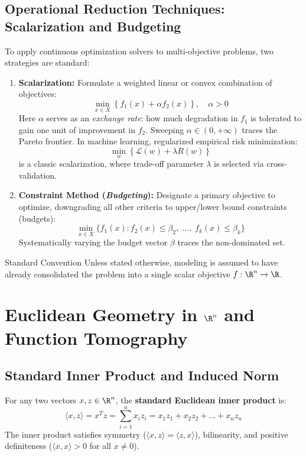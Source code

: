 \subsection{Operational Reduction Techniques: Scalarization and Budgeting}
To apply continuous optimization solvers to multi-objective problems, two strategies are standard:
\begin{enumerate}
    \item \textbf{Scalarization:} Formulate a weighted linear or convex combination of objectives:
    \begin{equation}
    \min_{x \in X} \left\{ f_1(x) + \alpha f_2(x) \right\}, \quad \alpha > 0
    \end{equation}
    Here $\alpha$ serves as an \textit{exchange rate}: how much degradation in $f_1$ is tolerated to gain one unit of improvement in $f_2$. Sweeping $\alpha \in (0, +\infty)$ traces the Pareto frontier. In machine learning, regularized empirical risk minimization:
    \begin{equation}
    \min_w \left\{ \mathcal{L}(w) + \lambda R(w) \right\}
    \end{equation}
    is a classic scalarization, where trade-off parameter $\lambda$ is selected via cross-validation.
    
    \item \textbf{Constraint Method (\textit{Budgeting}):} Designate a primary objective to optimize, downgrading all other criteria to upper/lower bound constraints (budgets):
    \begin{equation}
    \min_{x \in X} \{ f_1(x) : f_2(x) \le \beta_2, \; \dots, \; f_k(x) \le \beta_k \}
    \end{equation}
    Systematically varying the budget vector $\beta$ traces the non-dominated set.
\end{enumerate}

\begin{noteblock}{Standard Convention}
Unless stated otherwise, modeling is assumed to have already consolidated the problem into a single scalar objective $f: \R^n \to \R$.
\end{noteblock}


\FloatBarrier
\section{Euclidean Geometry in \texorpdfstring{$\R^n$}{R\textasciicircum n} and Function Tomography}
\label{sec:opt-euclidean-geometry-tomography-en}

\subsection{Standard Inner Product and Induced Norm}
For any two vectors $x, z \in \R^n$, the \textbf{standard Euclidean inner product} is:
\begin{equation}
\langle x, z \rangle = x^T z = \sum_{i=1}^n x_i z_i = x_1 z_1 + x_2 z_2 + \dots + x_n z_n
\end{equation}
The inner product satisfies symmetry ($\langle x, z \rangle = \langle z, x \rangle$), bilinearity, and positive definiteness ($\langle x, x \rangle > 0$ for all $x \neq 0$).

